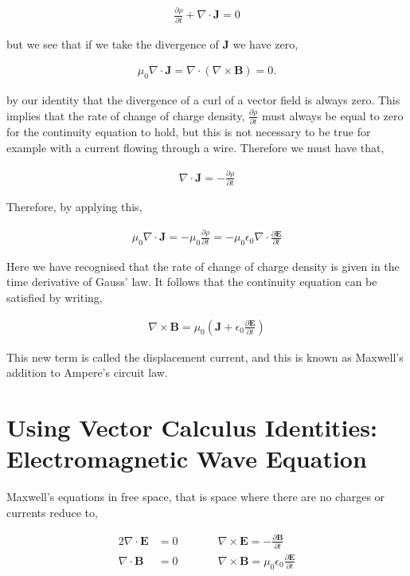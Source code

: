 \documentclass[11pt]{amsart}
\begin{document}
\begin{align*}
  \frac{\partial\rho}{\partial t} + \nabla\cdot\mathbf{J} = 0
\end{align*}

but we see that if we take the divergence of $\mathbf{J}$ we have zero,

\begin{align*}
  \mu_0 \nabla\cdot\mathbf{J} = \nabla\cdot(\nabla\times\mathbf{B}) = 0.
\end{align*}

by our identity that the divergence of a curl of a vector field is always zero. This implies that the rate of change of charge density, $\frac{\partial\rho}{\partial t}$ must always be equal to zero for the continuity equation to hold, but this is not necessary to be true for example with a current flowing through a wire. Therefore we must have that,

\begin{align*}
  \nabla\cdot\mathbf{J} = -\frac{\partial\rho}{\partial t}
\end{align*}

Therefore, by applying this,

\begin{align*}
  \mu_0\nabla\cdot\mathbf{J} = -\mu_0\frac{\partial\rho}{\partial t} = -\mu_0\epsilon_0\nabla\cdot\frac{\partial\mathbf{E}}{\partial t}
\end{align*}

Here we have recognised that the rate of change of charge density is given in the time derivative of Gauss' law. It follows that the continuity equation can be satisfied by writing,

\begin{align*}
  \nabla\times\mathbf{B} = \mu_0\left(\mathbf{J} + \epsilon_0 \frac{\partial \mathbf{E}}{\partial t}\right)
\end{align*}

This new term is called the displacement current, and this is known as Maxwell's addition to Ampere's circuit law.

\section{Using Vector Calculus Identities: Electromagnetic Wave Equation}

Maxwell's equations in free space, that is space where there are no charges or currents reduce to,

\begin{alignat*}{2}
  \nabla\cdot\mathbf{E} &= 0 \qquad &&\nabla\times\mathbf{E} = -\frac{\partial \mathbf{B}}{\partial t} \\
  \nabla\cdot\mathbf{B} &= 0 \qquad &&\nabla\times\mathbf{B} = \mu_0\epsilon_0\frac{\partial\mathbf{E}}{\partial t}
\end{alignat*}
\end{document}
